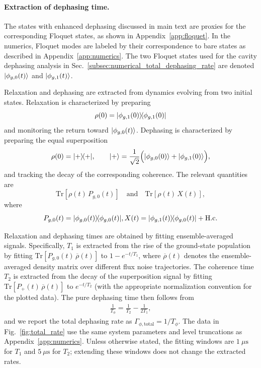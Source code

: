 \paragraph{Extraction of dephasing time.} The states with enhanced dephasing discussed in main text are proxies for the corresponding Floquet states, as shown in Appendix~\ref{app:floquet}.
In the numerics, Floquet modes are labeled by their correspondence to bare states as
described in Appendix~\ref{app:numerics}. The two Floquet states used for the cavity
dephasing analysis in Sec.~\ref{subsec:numerical_total_dephasing_rate}
are denoted $|\phi_{g,0}(t)\rangle$ and $|\phi_{g,1}(t)\rangle$.

Relaxation and dephasing are extracted from dynamics evolving from two initial states. Relaxation is
characterized by preparing
\[
\rho(0)=|\phi_{g,1}(0)\rangle\!\langle\phi_{g,1}(0)|
\]
and monitoring the return toward \(|\phi_{g,0}(t)\rangle\). Dephasing is characterized by preparing the equal superposition
\[
\rho(0)=|+\rangle\!\langle+|,
\qquad
|+\rangle=\frac{1}{\sqrt{2}}\Big(|\phi_{g,0}(0)\rangle+|\phi_{g,1}(0)\rangle\Big),
\]
and tracking the decay of the corresponding coherence. The relevant quantities are
\[
\mathrm{Tr}\!\left[\rho(t)\,P_{g,0}(t)\right]
\quad \text{and} \quad
\mathrm{Tr}\!\left[\rho(t)\,X(t)\right],
\]
where
\[
P_{g,0}(t)=|\phi_{g,0}(t)\rangle\!\langle\phi_{g,0}(t)|,
X(t)=|\phi_{g,1}(t)\rangle\!\langle\phi_{g,0}(t)|+\mathrm{H.c.}
\]


Relaxation and dephasing times are obtained by fitting ensemble-averaged signals.
Specifically, $T_1$ is extracted from the rise of the ground-state population by fitting
$\mathrm{Tr}\!\left[P_{g,0}(t)\,\overline{\rho}(t)\right]$ to $1-e^{-t/T_1}$, where
$\overline{\rho}(t)$ denotes the ensemble-averaged density matrix over different flux noise trajectories. The coherence time $T_2$
is extracted from the decay of the superposition signal by fitting
$\mathrm{Tr}\!\left[P_{+}(t)\,\overline{\rho}(t)\right]$ to $e^{-t/T_2}$ (with the appropriate
normalization convention for the plotted data). The pure dephasing time then follows from
\begin{align}
\frac{1}{T_\phi}=\frac{1}{T_2}-\frac{1}{2T_1},
\end{align}
and we report the total dephasing rate as $\Gamma_{\phi,\mathrm{total}}=1/T_\phi$.
The data in Fig.~\ref{fig:total_rate} use the same system parameters and level truncations
as Appendix~\ref{app:numerics}. Unless otherwise stated, the fitting windows are
$1~\mu\mathrm{s}$ for $T_1$ and $5~\mu\mathrm{s}$ for $T_2$; extending these windows
does not change the extracted rates.